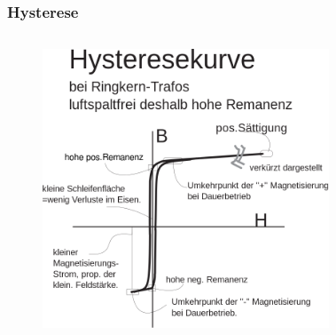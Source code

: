 \begin{frame}
  \frametitle{Hysterese}
  \begin{columns}[t]
    \begin{center}
      \begin{figure}
        \includegraphics[width=1\textwidth,height=.6\textheight,keepaspectratio]{a08/Hard_hysteresis_de.png}
      \end{figure}
    \end{center}
    \begin{center}
      \begin{figure}

\end{figure}
\end{center}
\end{columns}
\end{frame}
